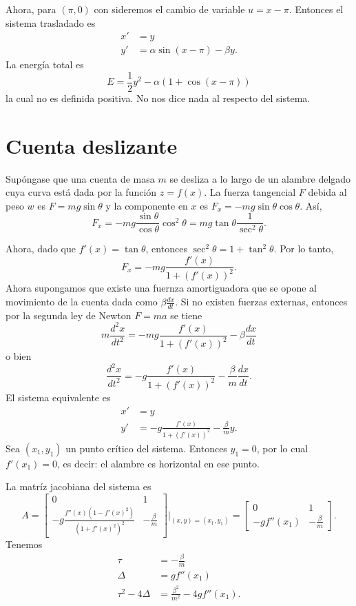 \documentclass[11pt,letterpaper,draft]{report}
\newcommand\<{\langle}
\renewcommand\>{\rangle}
\begin{document}
Ahora, para $(\pi,0)$ con sideremos el cambio de variable $u=x-\pi$.
Entonces el sistema trasladado es
\begin{align*}
  x' &= y \\
  y' &= \alpha\sin(x-\pi) - \beta y.
\end{align*}
La energía total es
\[
  E = \frac{1}{2}y^{2} - \alpha(1+\cos(x-\pi))
\]
la cual no es definida positiva. No nos dice nada al respecto del
sistema.

\section{Cuenta deslizante}
Supóngase que una cuenta de masa $m$ se desliza a lo largo de un
alambre delgado cuya curva está dada por la función $z=f(x)$. La
fuerza tangencial $F$ debida al peso $w$ es $F=mg\sin\theta$ y la
componente en $x$ es $F_x=-mg\sin\theta\cos\theta$. Así,
\[
  F_x = -mg \frac{\sin\theta}{\cos\theta}\cos^{2}\theta
  =mg\tan\theta \frac{1}{\sec^{2}\theta}
.\]

Ahora, dado que $f'(x)=\tan\theta$, entonces
$\sec^{2}\theta=1+\tan^{2}\theta$.
Por lo tanto,
\[
  F_x = -mg\frac{f'(x)}{1+(f'(x))^{2}}
.\]
Ahora supongamos que existe una fuernza amortiguadora que se opone al
movimiento de la cuenta dada como $\beta\frac{dx}{dt}$. Si no existen
fuerzas externas, entonces por la segunda ley de Newton $F=ma$ se
tiene
\[
  m\frac{d^{2}x}{dt^{2}} = -mg\frac{f'(x)}{1+(f'(x))^{2}}
  -\beta\frac{dx}{dt}
\]
o bien
\[
  \frac{d^{2}x}{dt^{2}} = -g\frac{f'(x)}{1+(f'(x))^{2}}
  - \frac{\beta}{m} \frac{dx}{dt}
.\]
El sistema equivalente es
\begin{align*}
  x' &= y \\
  y' &= -g\frac{f'(x)}{1+(f'(x))^{2}}-\frac{\beta}{m}y.
\end{align*}
Sea $(x_1,y_1)$ un punto crítico del sistema. Entonces $y_1=0$,
por lo cual $f'(x_1)=0$, es decir:
el alambre es horizontal en ese punto.

La matríz jacobiana del sistema es
\[
  A
  =
  \begin{bmatrix}
    0 & 1 \\
    -g\frac{f''(x)(1-f'(x)^{2})}{(1+f'(x)^{2})^{2}}
      & -\frac{\beta}{m}
  \end{bmatrix} \Big|_{(x,y)=(x_1,y_1)}
  =
  \begin{bmatrix}
    0 & 1 \\
    -gf''(x_1) & -\frac{\beta}{m}
  \end{bmatrix}.
\]
Tenemos
\begin{align*}
  \tau &= -\frac{\beta}{m} \\
  \Delta &= gf''(x_1) \\
  \tau^{2}-4\Delta &= \frac{\beta^{2}}{m^{2}}-4gf''(x_1).
\end{align*}
\end{document}
